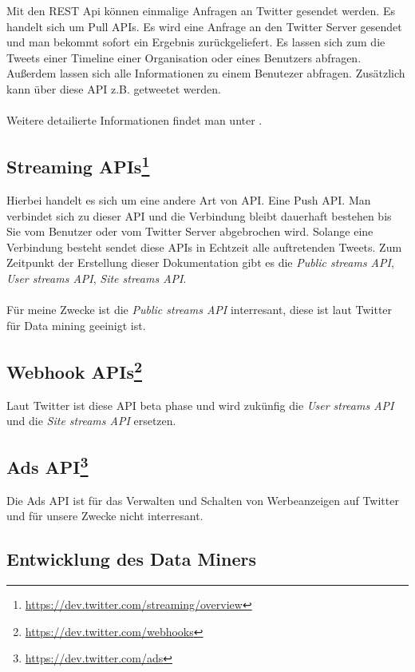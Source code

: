 Mit den REST Api können einmalige Anfragen an Twitter gesendet werden. Es handelt sich um Pull APIs.
Es wird eine Anfrage an den Twitter Server gesendet und man bekommt sofort ein Ergebnis zurückgeliefert.
Es lassen sich zum die Tweets einer Timeline einer Organisation oder eines Benutzers abfragen.
Außerdem lassen sich alle Informationen zu einem Benutezer abfragen. Zusätzlich kann über diese API z.B. getweetet werden.
\\
\\
Weitere detailierte Informationen findet man unter .

\subsection{Streaming APIs\footnote{\url{https://dev.twitter.com/streaming/overview}}}

Hierbei handelt es sich um eine andere Art von API. Eine Push API. Man verbindet sich zu dieser API und die Verbindung bleibt dauerhaft bestehen
bis Sie vom Benutzer oder vom Twitter Server abgebrochen wird. Solange eine Verbindung besteht sendet diese APIs in Echtzeit alle auftretenden Tweets.
Zum Zeitpunkt der Erstellung dieser Dokumentation gibt es die \emph{Public streams API}, \emph{User streams API}, \emph{Site streams API}.
\\
\\
Für meine Zwecke ist die \emph{Public streams API} interresant, diese ist laut Twitter für Data mining geeinigt ist.

\subsection{Webhook APIs\footnote{\url{https://dev.twitter.com/webhooks}}}

Laut Twitter ist diese API beta phase und wird zukünfig die \emph{User streams API} und die \emph{Site streams API} ersetzen.

\subsection{Ads API\footnote{\url{https://dev.twitter.com/ads}}}

Die Ads API ist für das Verwalten und Schalten von Werbeanzeigen auf Twitter und für unsere Zwecke nicht interresant.

\subsection{Entwicklung des Data Miners}



